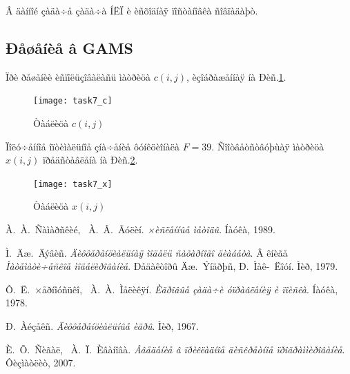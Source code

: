 \documentclass[14pt]{article}
\begin{document}
Â äàííîé çàäà÷å çàäà÷à ÍËÏ è èñõîäíàÿ ïîñòàíîâêà ñîâïàäàþò.

\subsection{Ðåøåíèå â GAMS}

Ïðè ðåøåíèè èñïîëüçîâàëàñü ìàòðèöà $c(i,j)$, èçîáðàæåííàÿ íà Ðèñ.\ref{task7_c}.

\begin{figure}
\centering
\texttt{[image: task7\_c]}
\caption{Òàáëèöà $c(i,j)$}
\label{task7_c}
\end{figure}

Ïîëó÷åííîå îïòèìàëüíîå çíà÷åíèå ôóíêöèîíàëà $F = 39$. Ñîîòâåòñòâóþùàÿ ìàòðèöà $x(i,j)$ ïðåäñòàâëåíà íà Ðèñ.\ref{task7_x}.

\begin{figure}
\centering
\texttt{[image: task7\_x]}
\caption{Òàáëèöà $x(i,j)$}
\label{task7_x}
\end{figure}

\begin{thebibliography}{0}

 À.~À.~Ñàìàðñêèé, ~À.~Â.~Ãóëèí.
\emph{×èñëåííûå ìåòîäû}. Íàóêà, 1989.

 Ì.~Äæ.~Äýâèñ.
\emph{Äèôôåðåíöèàëüíàÿ ìîäåëü ñàõàðíîãî äèàáåòà}.
Â êíèãå \emph{Ìàòåìàòè÷åñêîå ìîäåëèðîâàíèå}. Ðåäàêòîðû Äæ.~Ýíäðþñ, Ð.~Ìàê-~Ëîóí. Ìèð, 1979.

 Ô.~Ë.~×åðíîóñüêî, ~À.~À.~Ìåëèêÿí.
\emph{Èãðîâûå çàäà÷è óïðàâëåíèÿ è ïîèñêà}. Íàóêà, 1978.

 Ð.~Àéçåêñ.
\emph{Äèôôåðåíöèàëüíûå èãðû}. Ìèð, 1967.

 È.~Õ.~Ñèãàë, ~À.~Ï.~Èâàíîâà.
\emph{Ââåäåíèå â ïðèêëàäíîå äèñêðåòíîå ïðîãðàììèðîâàíèå}. Ôèçìàòëèò, 2007.


\end{thebibliography}
\end{document}
